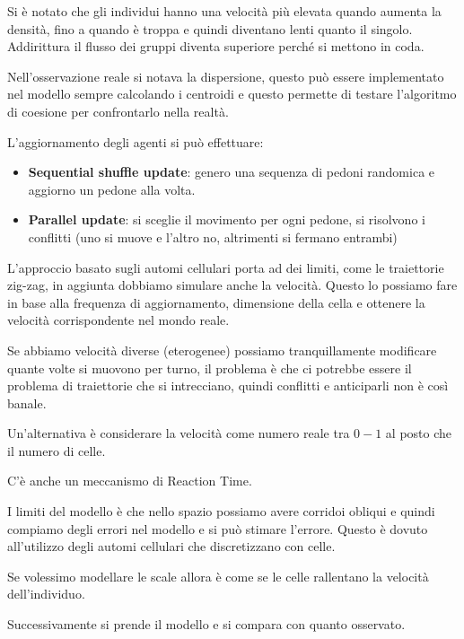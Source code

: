Si è notato che gli individui hanno una velocità più elevata quando aumenta la
densità, fino a quando è troppa e quindi diventano lenti quanto il singolo.
Addirittura il flusso dei gruppi diventa superiore perché si mettono in coda.

Nell'osservazione reale si notava la dispersione, questo può essere implementato
nel modello sempre calcolando i centroidi e questo permette di testare l'algoritmo
di coesione per confrontarlo nella realtà.

L'aggiornamento degli agenti si può effettuare:
\begin{itemize}
    \item \textbf{Sequential shuffle update}: genero una sequenza di pedoni
          randomica e aggiorno un pedone alla volta.
    \item \textbf{Parallel update}: si sceglie il movimento per ogni pedone, si
          risolvono i conflitti (uno si muove e l'altro no, altrimenti si fermano
          entrambi)
\end{itemize}
L'approccio basato sugli automi cellulari porta ad dei limiti, come le traiettorie
zig-zag, in aggiunta dobbiamo simulare anche la velocità. Questo lo possiamo fare
in base alla frequenza di aggiornamento, dimensione della cella e ottenere la
velocità corrispondente nel mondo reale. 

Se abbiamo velocità diverse (eterogenee) possiamo tranquillamente modificare quante 
volte si muovono per turno, il problema è che ci potrebbe essere il problema di 
traiettorie che si intrecciano, quindi conflitti e anticiparli non è così banale.

Un'alternativa è considerare la velocità come numero reale tra $0-1$ al posto che
il numero di celle.

C'è anche un meccanismo di Reaction Time.

I limiti del modello è che nello spazio possiamo avere corridoi obliqui e quindi
compiamo degli errori nel modello e si può stimare l'errore. Questo è dovuto 
all'utilizzo degli automi cellulari che discretizzano con celle.

Se volessimo modellare le scale allora è come se le celle rallentano la velocità
dell'individuo.

Successivamente si prende il modello e si compara con quanto osservato.